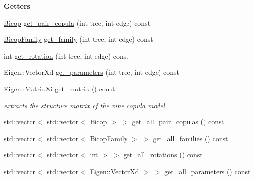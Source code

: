 \begin{Indent}{\bf Getters}\par
\begin{DoxyCompactItemize}
\item 
\hyperlink{classvinecopulib_1_1_bicop}{Bicop} \hyperlink{classvinecopulib_1_1_vinecop_a22262e99414e23dbe7c7f0e773041185}{get\+\_\+pair\+\_\+copula} (int tree, int edge) const 
\item 
\hyperlink{family_8hpp_a42e95cc06d33896199caab0c11ad44f3}{Bicop\+Family} \hyperlink{classvinecopulib_1_1_vinecop_ab2b5aecbe06c5219919f5b3c7436f1da}{get\+\_\+family} (int tree, int edge) const 
\item 
int \hyperlink{classvinecopulib_1_1_vinecop_abfa48760cc636cadce6fa875a883922a}{get\+\_\+rotation} (int tree, int edge) const 
\item 
Eigen\+::\+Vector\+Xd \hyperlink{classvinecopulib_1_1_vinecop_a2ddcc85cb5f2c05edd9093fe863812f6}{get\+\_\+parameters} (int tree, int edge) const 
\item 
Eigen\+::\+Matrix\+Xi \hyperlink{classvinecopulib_1_1_vinecop_aaac38f862f3b8ffd68ca04564fd0cf06}{get\+\_\+matrix} () const \hypertarget{classvinecopulib_1_1_vinecop_aaac38f862f3b8ffd68ca04564fd0cf06}{}\label{classvinecopulib_1_1_vinecop_aaac38f862f3b8ffd68ca04564fd0cf06}

\begin{DoxyCompactList}\small\item\em extracts the structure matrix of the vine copula model. \end{DoxyCompactList}\item 
std\+::vector$<$ std\+::vector$<$ \hyperlink{classvinecopulib_1_1_bicop}{Bicop} $>$ $>$ \hyperlink{classvinecopulib_1_1_vinecop_acb041d08afd6b7efac4f3769273300d7}{get\+\_\+all\+\_\+pair\+\_\+copulas} () const 
\item 
std\+::vector$<$ std\+::vector$<$ \hyperlink{family_8hpp_a42e95cc06d33896199caab0c11ad44f3}{Bicop\+Family} $>$ $>$ \hyperlink{classvinecopulib_1_1_vinecop_adcb572c440756a00dfaea0188caffb85}{get\+\_\+all\+\_\+families} () const 
\item 
std\+::vector$<$ std\+::vector$<$ int $>$ $>$ \hyperlink{classvinecopulib_1_1_vinecop_a7cbfca10a16e4c45f4b5d94343b5fc20}{get\+\_\+all\+\_\+rotations} () const 
\item 
std\+::vector$<$ std\+::vector$<$ Eigen\+::\+Vector\+Xd $>$ $>$ \hyperlink{classvinecopulib_1_1_vinecop_a3ab6a85281503d42f3a07036001bd657}{get\+\_\+all\+\_\+parameters} () const 
\end{DoxyCompactItemize}
\end{Indent}
